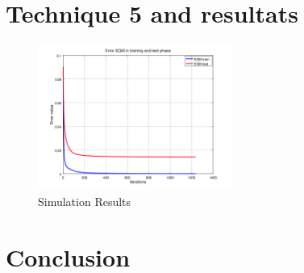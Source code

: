 \documentclass[journal]{IEEEtran}
\begin{document}
\section{Technique 5 and resultats}\blindtext
%
%
\begin{figure}[h]
	\centering
	\includegraphics[width=2.5in]{../OctaveNeurons/rs31}
	\caption{Simulation Results}
	\label{fig_sim}
\end{figure}
\blindtext






\section{Conclusion}
\blindtext


%
%

%
\end{document}
